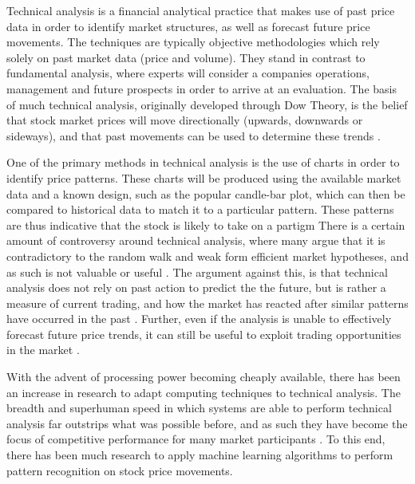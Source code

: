 \documentclass[a4paper,11pt,oneside]{article}
\theoremstyle{plain}
\theoremstyle{definition}
\begin{document}
	Technical analysis is a financial analytical practice that makes use of past price data in order to identify market 
	structures, as well as forecast future price movements. The techniques are typically objective methodologies 
	which rely solely on past market data (price and volume). They stand in contrast to fundamental analysis, where 
	experts will consider a companies operations, management and future prospects in order to arrive at an evaluation. 
	The basis of much technical analysis, originally developed through Dow Theory, is the belief that stock market 
	prices will move directionally (upwards, downwards or sideways), and that past movements can be used to 
	determine these trends \citep{Murphy}.
	\hfill \break 
	
	One of the primary methods in technical analysis is the use of charts in order to identify price patterns. 
	These charts will be produced using the available market data and a known design, such as the popular candle-bar 
	plot, which can then be compared to historical data to match it to a particular pattern. These patterns are thus 
	indicative that the stock is likely to take on a partigm
	There is a certain amount of controversy around technical analysis, where many argue that it is contradictory 
	to the random walk and weak form efficient market hypotheses, and as such is not valuable or useful \citep{Griffioen}. 
	The argument against this, is that technical analysis does not rely on past action to predict the the future, but is 
	rather a measure of current trading, and how the market has reacted after similar patterns have occurred in the 
	past \citep{Kahn}. Further, even if the analysis is unable to effectively forecast future price trends, it can still be useful 
	to exploit trading opportunities in the market \citep{Schwager}.
	\hfill \break 
	
	With the advent of processing power becoming cheaply available, there has been an increase in research to 
	adapt computing techniques to technical analysis. The breadth and superhuman speed in which systems are 
	able to perform technical analysis far outstrips what was possible before, and as such they have become the 
	focus of competitive performance for many market participants \citep{Johnson}. To this end, there has been much 
	research to apply machine learning algorithms to perform pattern recognition on stock price movements.
	\hfill \break
	
\end{document}
